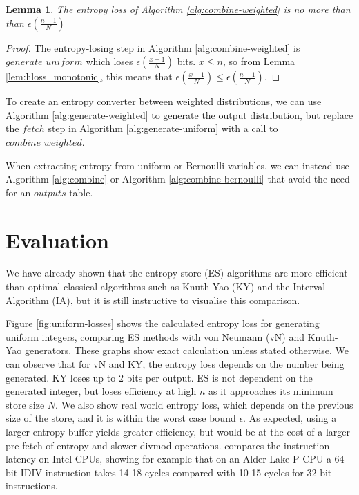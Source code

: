 \documentclass[12pt]{article}
\newtheorem{lemma}{Lemma}
\begin{document}
\begin{lemma}
The entropy loss of Algorithm \ref{alg:combine-weighted} is no more than than $\epsilon(\frac{n-1}{N})$
\end{lemma}

\begin{proof}
    The entropy-losing step in Algorithm \ref{alg:combine-weighted} is $generate\_uniform$ which loses $\epsilon(\frac{x-1}{N})$ bits. $x \le n$, so from Lemma \ref{lem:hloss_monotonic}, this means that $\epsilon(\frac{x-1}{N}) \le \epsilon(\frac{n-1}{N})$.
\end{proof}

To create an entropy converter between weighted distributions, we can use Algorithm \ref{alg:generate-weighted} to generate the output distribution, but replace the $fetch$ step in Algorithm \ref{alg:generate-uniform} with a call to $combine\_weighted$.

When extracting entropy from uniform or Bernoulli variables, we can instead use Algorithm \ref{alg:combine} or Algorithm \ref{alg:combine-bernoulli} that avoid the need for an $outputs$ table.



\section {Evaluation}

We have already shown that the entropy store (ES) algorithms are more efficient than optimal classical algorithms such as Knuth-Yao (KY) and the Interval Algorithm (IA), but it is still instructive to visualise this comparison.

Figure \ref{fig:uniform-losses} shows the calculated entropy loss for generating uniform integers, comparing ES methods with von Neumann (vN) and Knuth-Yao generators. These graphs show exact calculation unless stated otherwise. We can observe that for vN and KY, the entropy loss depends on the number being generated. KY loses up to 2 bits per output. ES is not dependent on the generated integer, but loses efficiency at high $n$ as it approaches its minimum store size $N$. We also show real world entropy loss, which depends on the previous size of the store, and it is within the worst case bound $\epsilon$. As expected, using a larger entropy buffer yields greater efficiency, but would be at the cost of a larger pre-fetch of entropy and slower divmod operations. \cite{Abel19a} compares the instruction latency on Intel CPUs, showing for example that on an Alder Lake-P CPU a 64-bit IDIV instruction takes 14-18 cycles compared with 10-15 cycles for 32-bit instructions.
\end{document}
